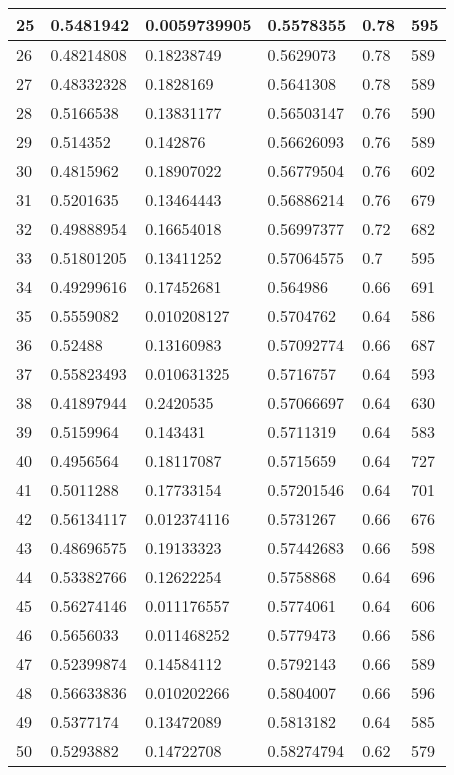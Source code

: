\begin{longtable}{|l|l|l|l|l|l|}
25 & 0.5481942 & 0.0059739905 & 0.5578355 & 0.78 & 595 \\ \hline 
26 & 0.48214808 & 0.18238749 & 0.5629073 & 0.78 & 589 \\ \hline 
27 & 0.48332328 & 0.1828169 & 0.5641308 & 0.78 & 589 \\ \hline 
28 & 0.5166538 & 0.13831177 & 0.56503147 & 0.76 & 590 \\ \hline 
29 & 0.514352 & 0.142876 & 0.56626093 & 0.76 & 589 \\ \hline 
30 & 0.4815962 & 0.18907022 & 0.56779504 & 0.76 & 602 \\ \hline 
31 & 0.5201635 & 0.13464443 & 0.56886214 & 0.76 & 679 \\ \hline 
32 & 0.49888954 & 0.16654018 & 0.56997377 & 0.72 & 682 \\ \hline 
33 & 0.51801205 & 0.13411252 & 0.57064575 & 0.7 & 595 \\ \hline 
34 & 0.49299616 & 0.17452681 & 0.564986 & 0.66 & 691 \\ \hline 
35 & 0.5559082 & 0.010208127 & 0.5704762 & 0.64 & 586 \\ \hline 
36 & 0.52488 & 0.13160983 & 0.57092774 & 0.66 & 687 \\ \hline 
37 & 0.55823493 & 0.010631325 & 0.5716757 & 0.64 & 593 \\ \hline 
38 & 0.41897944 & 0.2420535 & 0.57066697 & 0.64 & 630 \\ \hline 
39 & 0.5159964 & 0.143431 & 0.5711319 & 0.64 & 583 \\ \hline 
40 & 0.4956564 & 0.18117087 & 0.5715659 & 0.64 & 727 \\ \hline 
41 & 0.5011288 & 0.17733154 & 0.57201546 & 0.64 & 701 \\ \hline 
42 & 0.56134117 & 0.012374116 & 0.5731267 & 0.66 & 676 \\ \hline 
43 & 0.48696575 & 0.19133323 & 0.57442683 & 0.66 & 598 \\ \hline 
44 & 0.53382766 & 0.12622254 & 0.5758868 & 0.64 & 696 \\ \hline 
45 & 0.56274146 & 0.011176557 & 0.5774061 & 0.64 & 606 \\ \hline 
46 & 0.5656033 & 0.011468252 & 0.5779473 & 0.66 & 586 \\ \hline 
47 & 0.52399874 & 0.14584112 & 0.5792143 & 0.66 & 589 \\ \hline 
48 & 0.56633836 & 0.010202266 & 0.5804007 & 0.66 & 596 \\ \hline 
49 & 0.5377174 & 0.13472089 & 0.5813182 & 0.64 & 585 \\ \hline 
50 & 0.5293882 & 0.14722708 & 0.58274794 & 0.62 & 579 \\ \hline 
\end{longtable}